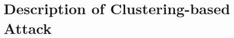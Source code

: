\documentclass[bachelor]{thesis-uestc}
\begin{document}













\section{Description of Clustering-based Attack}
\label{sec:clustering-attack-description}
\end{document}
